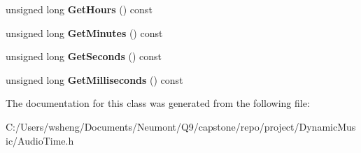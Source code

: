 \begin{DoxyCompactItemize}
unsigned long {\bfseries Get\+Hours} () const
\item 
\mbox{\label{class_audio_time_acbeb8bc341130bc1c1f434048488e1ee}} 
unsigned long {\bfseries Get\+Minutes} () const
\item 
\mbox{\label{class_audio_time_a4e21c15b6f48fe238e1fd260ea388dac}} 
unsigned long {\bfseries Get\+Seconds} () const
\item 
\mbox{\label{class_audio_time_a23c39665aaad01424e40d6c9dd1f7c41}} 
unsigned long {\bfseries Get\+Milliseconds} () const
\end{DoxyCompactItemize}


The documentation for this class was generated from the following file\+:\begin{DoxyCompactItemize}
\item 
C\+:/\+Users/wsheng/\+Documents/\+Neumont/\+Q9/capstone/repo/project/\+Dynamic\+Music/Audio\+Time.\+h\end{DoxyCompactItemize}
